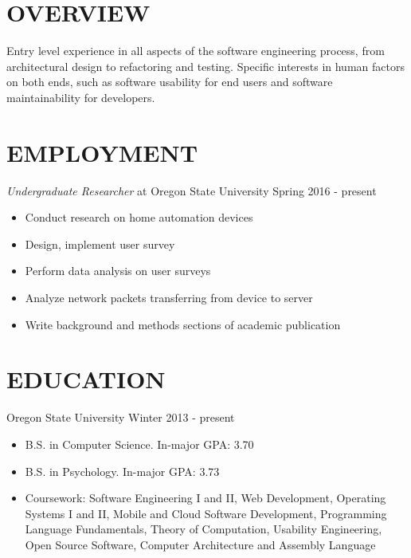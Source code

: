 \documentclass[line, margin]{res}
\begin{document}
\address{2476 Bain CT SE\\ Albany, OR 97322\\ (541) 740-6700\\ hoffera@oregonstate.edu\\github.com/AlexDHoffer}

\begin{resume}
\section{OVERVIEW}
Entry level experience in all aspects of the software engineering process, from architectural design to refactoring and testing. Specific interests in human factors on both ends, such as software usability for end users and software maintainability for developers. \\

\section{EMPLOYMENT}
\textit{Undergraduate Researcher} at Oregon State University \hfill Spring 2016 - present \\
\begin{itemize}
\item Conduct research on home automation devices
\item Design, implement user survey
\item Perform data analysis on user surveys
\item Analyze network packets transferring from device to server
\item Write background and methods sections of academic publication
\end{itemize}

\section{EDUCATION}
Oregon State University \hfill Winter 2013 - present \\ 

\begin{itemize}
\item B.S. in Computer Science. In-major GPA: 3.70 
\item B.S. in Psychology. In-major GPA: 3.73
\item Coursework: Software Engineering I and II, Web Development, Operating Systems I and II, Mobile and Cloud Software Development, Programming Language Fundamentals, Theory of Computation, Usability Engineering, Open Source Software, Computer Architecture and Assembly Language \\
\end{itemize}


\end{resume}
\end{document}
